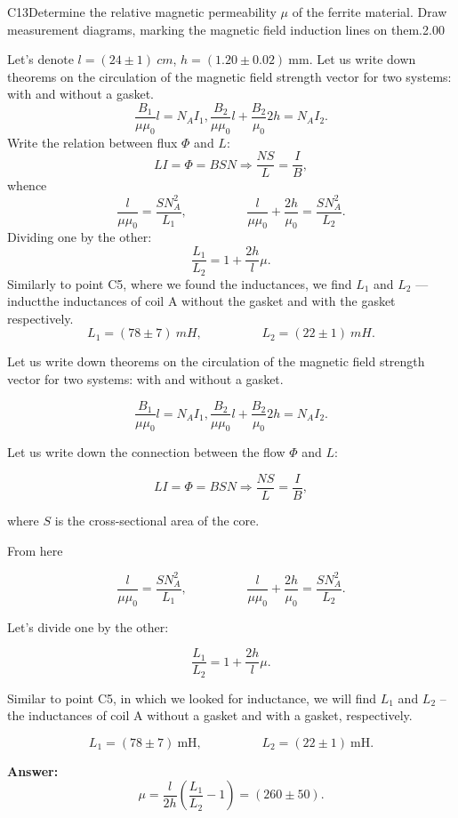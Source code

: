 \documentclass[11pt,a4paper]{article}
\begin{document}
\begin{solcard}{C13}{Determine the relative magnetic permeability $\mu$ of the ferrite material. Draw measurement diagrams, marking the magnetic field induction lines on them.}{2.00}

Let's denote $l=(24\pm1)~cm$, $h=(1.20\pm0.02)~\mathrm{mm}$. Let us write down theorems on the circulation of the magnetic field strength vector for two systems: with and without a gasket. $$\dfrac{B_1}{\mu\mu_0}l=N_AI_1,\dfrac{B_2}{\mu\mu_0}l+\dfrac{B_2}{\mu_0}2h=N_AI_2.$$ Write the relation between flux $\Phi$ and $L$: $$LI = \Phi = BSN \Rightarrow \dfrac{NS}{L} = \dfrac{I}{B},$$ whence $$\dfrac{l}{\mu\mu_0}=\dfrac{SN_A^2}{L_1},\hspace{2cm}\dfrac{l}{\mu\mu_0}+\dfrac{2h}{\mu_0}=\dfrac{SN_A^2}{L_2}.$$ Dividing one by the other: $$\dfrac{L_1}{L_2}=1+\dfrac{2h}{l}\mu.$$ Similarly to point C5, where we found the inductances, we find $L_1$ and $L_2$ — inductthe inductances of coil A without the gasket and with the gasket respectively. $$L_1=(78\pm7)~mH,\hspace{2cm}L_2=(22\pm1)~mH.$$


Let us write down theorems on the circulation of the magnetic field strength vector for two systems: with and without a gasket.


$$\dfrac{B_1}{\mu\mu_0}l=N_AI_1,\dfrac{B_2}{\mu\mu_0}l+\dfrac{B_2}{\mu_0}2h=N_AI_2.$$


Let us write down the connection between the flow $\Phi$ and $L:$


$$LI=\Phi=BSN\Rightarrow\dfrac{NS}{L}=\dfrac{I}{B},$$


where $S$ is the cross-sectional area of the core.


From here


$$\dfrac{l}{\mu\mu_0}=\dfrac{SN_A^2}{L_1},\hspace{2cm}\dfrac{l}{\mu\mu_0}+\dfrac{2h}{\mu_0}=\dfrac{SN_A^2}{L_2}.$$


Let's divide one by the other:


$$\dfrac{L_1}{L_2}=1+\dfrac{2h}{l}\mu.$$


Similar to point C5, in which we looked for inductance, we will find $L_1$ and $L_2$ – the inductances of coil A without a gasket and with a gasket, respectively.


$$L_1=(78\pm7)~\mathrm{mH},\hspace{2cm}L_2=(22\pm1)~\mathrm{mH}.$$

\par\smallskip\noindent\textbf{Answer:} $$\mu=\dfrac{l}{2h}\left(\dfrac{L_1}{L_2}-1\right)=(260\pm50).$$
\end{solcard}
\end{document}
